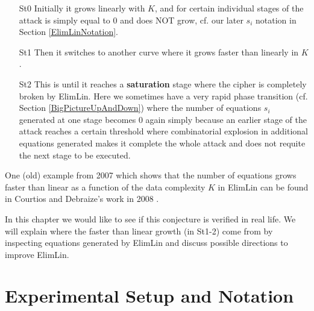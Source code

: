 \begin{enumerate}
	\item[St0]
	Initially it grows linearly with $K$,
	and for certain individual stages of the attack is
	simply equal to 0 and does NOT grow,
	cf. our later $s_i$ notation in Section \ref{ElimLinNotation}.
	\item[St1]
	Then it switches to another curve where
	it grows faster than linearly in $K$.
	\item[St2]
	This is until it reaches a \textbf{saturation} stage where the
	cipher is completely broken by ElimLin.
	Here we sometimes have a very rapid phase transition (cf. Section \ref{BigPictureUpAndDown})
	where the number of equations $s_i$ generated at one stage becomes 0 again
	simply because an earlier stage of the attack reaches a certain threshold where combinatorial explosion
	in additional equations generated
	makes it complete the whole attack and does not requite the next stage to be executed.
\end{enumerate}

\noindent
One (old) example from 2007 which shows that the number of equations grows faster than linear
as a function of the data complexity $K$ in ElimLin can be found in Courtios and Debraize's work in 2008 \cite{ToyRijSer}. 

In this chapter we would like to see if this conjecture is verified in real life. We will explain where the faster than linear growth (in St1-2) come from by inspecting equations generated by ElimLin and discuss possible directions to improve ElimLin.







\section{Experimental Setup and Notation}
\label{ElimLinSetup}
\label{ElimLinNotation}

